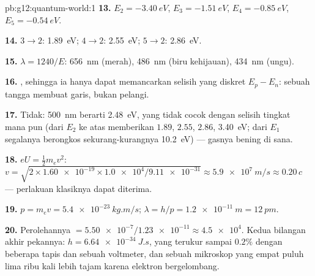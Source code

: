 \begin{solution}{pb:g12:quantum-world:1}
\textbf{13.} $E_2 = \qty{-3.40}{eV}$, $E_3 = \qty{-1.51}{eV}$,
$E_4 = \qty{-0.85}{eV}$, $E_5 = \qty{-0.54}{eV}$.

\textbf{14.} $3 \to 2$: \qty{1.89}{eV}; $4 \to 2$: \qty{2.55}{eV};
$5 \to 2$: \qty{2.86}{eV}.

\textbf{15.} $\lambda = 1240/E$: \qty{656}{nm} (merah), \qty{486}{nm}
(biru kehijauan), \qty{434}{nm} (ungu).

\textbf{16.}   , sehingga ia hanya dapat memancarkan
selisih yang diskret $E_p - E_n$: sebuah tangga membuat garis, bukan
pelangi.

\textbf{17.} Tidak: \qty{500}{nm} berarti \qty{2.48}{eV}, yang tidak cocok dengan
selisih tingkat mana pun (dari $E_2$ ke atas memberikan $1.89$, $2.55$, $2.86$,
\qty{3.40}{eV}; dari $E_1$ segalanya berongkos sekurang-kurangnya \qty{10.2}{eV})
--- gasnya bening di sana.

\textbf{18.} $eU = \tfrac12 m_e v^2$: $v = \sqrt{2 \times
\num{1.60e-19} \times \num{1.0e4}/\num{9.11e-31}} \approx
\qty{5.9e7}{m/s} \approx 0.20\,c$ --- perlakuan klasiknya dapat diterima.

\textbf{19.} $p = m_e v = \qty{5.4e-23}{kg.m/s}$;
$\lambda = h/p = \qty{1.2e-11}{m} = \qty{12}{pm}$.

\textbf{20.} Perolehannya $= \num{5.50e-7}/\num{1.23e-11} \approx \num{4.5e4}$.
Kedua bilangan akhir pekannya: $h = \qty{6.64e-34}{J.s}$, yang terukur sampai
$0.2\%$ dengan beberapa tapis dan sebuah voltmeter, dan sebuah mikroskop yang
empat puluh lima ribu kali lebih tajam karena elektron bergelombang.
\end{solution}
